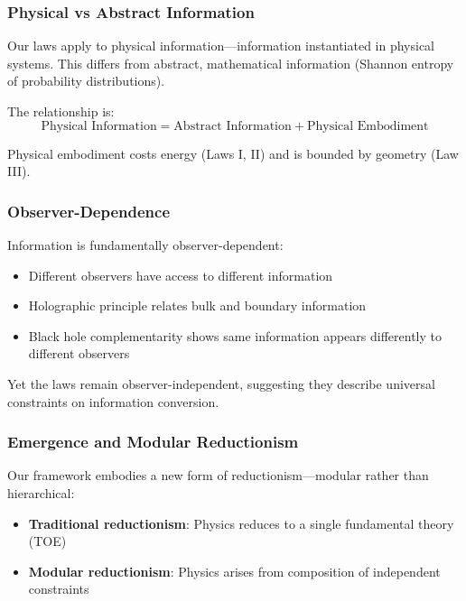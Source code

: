 \documentclass[11pt,a4paper]{article}
\theoremstyle{plain}
\theoremstyle{definition}
\theoremstyle{remark}
\begin{document}
\subsubsection{Physical vs Abstract Information}

Our laws apply to physical information—information instantiated in physical systems. This differs from abstract, mathematical information (Shannon entropy of probability distributions).

The relationship is:
\begin{equation}
\text{Physical Information} = \text{Abstract Information} + \text{Physical Embodiment}
\end{equation}

Physical embodiment costs energy (Laws I, II) and is bounded by geometry (Law III).

\subsubsection{Observer-Dependence}

Information is fundamentally observer-dependent:
\begin{itemize}[leftmargin=*]
\item Different observers have access to different information
\item Holographic principle relates bulk and boundary information
\item Black hole complementarity shows same information appears differently to different observers
\end{itemize}

Yet the laws remain observer-independent, suggesting they describe universal constraints on information conversion.

\subsubsection{Emergence and Modular Reductionism}

Our framework embodies a new form of reductionism—modular rather than hierarchical:

\begin{itemize}[leftmargin=*]
\item \textbf{Traditional reductionism}: Physics reduces to a single fundamental theory (TOE)
\item \textbf{Modular reductionism}: Physics arises from composition of independent constraints
\end{itemize}
\end{document}
